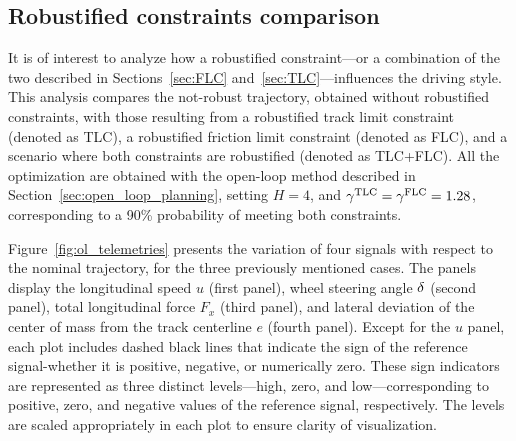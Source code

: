 \subsection{Robustified constraints comparison}
It is of interest to analyze how a robustified constraint---or a combination of the two described in Sections~\ref{sec:FLC} and~\ref{sec:TLC}---influences the driving style. This analysis compares the not-robust trajectory, obtained without robustified constraints, with those resulting from a robustified track limit constraint (denoted as TLC), a robustified friction limit constraint (denoted as FLC), and a scenario where both constraints are robustified (denoted as TLC+FLC). All the optimization are obtained with the open-loop method described in Section~\ref{sec:open_loop_planning}, setting $H=4$, and $\gamma^\textrm{TLC}=\gamma^\textrm{FLC}=1.28$, corresponding to a 90\% probability of meeting both constraints. 

Figure~\ref{fig:ol_telemetries} presents the variation of four signals with respect to the nominal trajectory, for the three previously mentioned cases. The panels display the longitudinal speed $u$ (first panel), wheel steering angle $\delta$ (second panel), total longitudinal force $F_x$ (third panel), and lateral deviation of the center of mass from the track centerline $e$ (fourth panel). Except for the $u$ panel, each plot includes dashed black lines that indicate the sign of the reference signal-whether it is positive, negative, or numerically zero. These sign indicators are represented as three distinct levels---high, zero, and low---corresponding to positive, zero, and negative values of the reference signal, respectively. The levels are scaled appropriately in each plot to ensure clarity of visualization.

